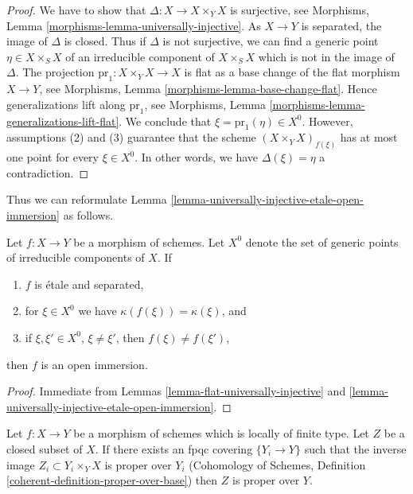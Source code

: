\begin{proof}
We have to show that $\Delta : X \to X \times_Y X$ is surjective, see
Morphisms, Lemma \ref{morphisms-lemma-universally-injective}.
As $X \to Y$ is separated, the image of $\Delta$ is closed.
Thus if $\Delta$ is not surjective, we can find a generic point
$\eta \in X \times_S X$ of an irreducible component of $X \times_S X$
which is not in the image of $\Delta$. The projection
$\text{pr}_1 : X \times_Y X \to X$
is flat as a base change of the flat morphism $X \to Y$, see
Morphisms, Lemma \ref{morphisms-lemma-base-change-flat}.
Hence generalizations lift along $\text{pr}_1$, see
Morphisms, Lemma \ref{morphisms-lemma-generalizations-lift-flat}.
We conclude that $\xi = \text{pr}_1(\eta) \in X^0$.
However, assumptions (2) and (3) guarantee that the scheme
$(X \times_Y X)_{f(\xi)}$ has at most one point for every $\xi \in X^0$.
In other words, we have $\Delta(\xi) = \eta$ a contradiction.
\end{proof}

\noindent
Thus we can reformulate
Lemma \ref{lemma-universally-injective-etale-open-immersion} as follows.

\begin{lemma}
\label{lemma-characterize-open-immersion}
Let $f : X \to Y$ be a morphism of schemes. Let $X^0$ denote the set
of generic points of irreducible components of $X$. If
\begin{enumerate}
\item $f$ is \'etale and separated,
\item for $\xi \in X^0$ we have $\kappa(f(\xi)) = \kappa(\xi)$, and
\item if $\xi, \xi' \in X^0$, $\xi \not = \xi'$, then $f(\xi) \not = f(\xi')$,
\end{enumerate}
then $f$ is an open immersion.
\end{lemma}

\begin{proof}
Immediate from Lemmas \ref{lemma-flat-universally-injective} and
\ref{lemma-universally-injective-etale-open-immersion}.
\end{proof}

\begin{lemma}
\label{lemma-descending-property-proper-over-base}
Let $f : X \to Y$ be a morphism of schemes which is locally of finite type.
Let $Z$ be a closed subset of $X$. If there exists an fpqc covering
$\{Y_i \to Y\}$ such that the inverse image $Z_i \subset Y_i \times_Y X$
is proper over $Y_i$
(Cohomology of Schemes, Definition \ref{coherent-definition-proper-over-base})
then $Z$ is proper over $Y$.
\end{lemma}

